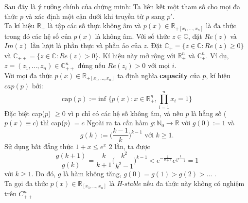 \documentclass[a4paper, 12pt]{report}
\begin{document}
Sau đây là ý tưởng chính của chứng minh: Ta liên kết một tham số cho mọi đa thức $p$ và xác định một cận dưới khi truyền từ $p$ sang $p'$.\\
Ta kí hiệu $\mathbb{R}_{+}$ là tập các số thực không âm và $p(x) \in \mathbb{R}_{+[x_1,...,x_n]}$ là đa thức trong đó các hệ số của $p(x)$ là không âm. Với số thức $z \in \mathbb{C}$, đặt $Re(z)$ và $Im(z)$ lần lượt là phần thực và phần ảo của $z$. Đặt $\mathbb{C}_{+} = \{z \in \mathbb{C}: Re(z) \geq 0\}$ và $\mathbb{C}_{++} = \{z \in \mathbb{C}: Re(z) > 0\}$. Kí hiệu này mở rộng với $\mathbb{R}_{+}^{n}$ và $\mathbb{C}_{+}^{n}$. Ví dụ, $z=(z_1,...,z_n) \in \mathbb{C}_{++}^{n}$ đúng nếu $Re(z_i) >0$ với mọi $i$.\\
Với mọi đa thức $p(x) \in \mathbb{R}_{+[x_1,...,x_n]}$ ta định nghĩa \textbf{capacity} của $p$, kí hiệu $cap(p)$ bởi:
\begin{equation*}
\textrm{cap}(p) := \textrm{inf }\{p(x): x \in \mathbb{R}_{+}^{n}, \displaystyle \prod_{i=1}^{n}x_i = 1 \}
\end{equation*}
Đặc biệt cap($p$) $\geq 0$ vì p chỉ có các hệ số không âm, và nếu $p$ là hằng số ($p(x) \equiv c$) thì cap($p$) $= c$
Ngoài ra ta cần hàm $g: \mathbb{N}_{0} \rightarrow \mathbb{R}$ với $g(0) :=1$ và 
\begin{equation*}
	g(k) := \Big( \frac{k-1}{k} \Big)^{k-1}  \textrm{                   với    } k \geq 1.
\end{equation*}
Sử dụng bất đẳng thức $1 +x \leq e^x$ 2 lần, ta được
\begin{equation*}
	\frac{g(k+1)}{g(k)} = \frac{k}{k+1} \Big( \frac{k^2}{k^2 - 1}\Big) ^{k-1} < e^{-\frac{1}{k+1}}e^{\frac{1}{k^2 - 1}} =1
\end{equation*}
với $k \geq 1$. Do đó, $g$ là hàm không tăng, $g(0) = g(1) > g(2) > ...$ .\\
Ta gọi đa thức $p(x) \in \mathbb{R}_{[x_1,...,x_n]}$ là \textit{H-stable} nếu đa thức này không có nghiệm trên $C_{++}^{n}$
\end{document}
